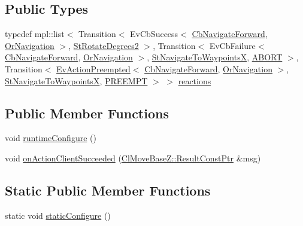 \subsection*{Public Types}
\begin{DoxyCompactItemize}
\item 
typedef mpl\+::list$<$ Transition$<$ Ev\+Cb\+Success$<$ \hyperlink{classcl__move__base__z_1_1CbNavigateForward}{Cb\+Navigate\+Forward}, \hyperlink{classsm__ridgeback__floor__coverage__static__1_1_1OrNavigation}{Or\+Navigation} $>$, \hyperlink{structsm__ridgeback__floor__coverage__static__1_1_1StRotateDegrees2}{St\+Rotate\+Degrees2} $>$, Transition$<$ Ev\+Cb\+Failure$<$ \hyperlink{classcl__move__base__z_1_1CbNavigateForward}{Cb\+Navigate\+Forward}, \hyperlink{classsm__ridgeback__floor__coverage__static__1_1_1OrNavigation}{Or\+Navigation} $>$, \hyperlink{structsm__ridgeback__floor__coverage__static__1_1_1StNavigateToWaypointsX}{St\+Navigate\+To\+WaypointsX}, \hyperlink{structsmacc_1_1default__transition__tags_1_1ABORT}{A\+B\+O\+RT} $>$, Transition$<$ \hyperlink{structsmacc_1_1default__events_1_1EvActionPreempted}{Ev\+Action\+Preempted}$<$ \hyperlink{classcl__move__base__z_1_1CbNavigateForward}{Cb\+Navigate\+Forward}, \hyperlink{classsm__ridgeback__floor__coverage__static__1_1_1OrNavigation}{Or\+Navigation} $>$, \hyperlink{structsm__ridgeback__floor__coverage__static__1_1_1StNavigateToWaypointsX}{St\+Navigate\+To\+WaypointsX}, \hyperlink{structsmacc_1_1default__transition__tags_1_1PREEMPT}{P\+R\+E\+E\+M\+PT} $>$ $>$ \hyperlink{structsm__ridgeback__floor__coverage__static__1_1_1StNavigateForward1_a6fc75d9b301c3f342815132aa4baba4e}{reactions}
\end{DoxyCompactItemize}
\subsection*{Public Member Functions}
\begin{DoxyCompactItemize}
\item 
void \hyperlink{structsm__ridgeback__floor__coverage__static__1_1_1StNavigateForward1_a5c06e290228ff7469666822fa041d767}{runtime\+Configure} ()
\item 
void \hyperlink{structsm__ridgeback__floor__coverage__static__1_1_1StNavigateForward1_ac459cf53276a9d78e6c40627c47a5e67}{on\+Action\+Client\+Succeeded} (\hyperlink{classcl__move__base__z_1_1ClMoveBaseZ_a99373d0c15ae96684462d8677f5fd632}{Cl\+Move\+Base\+Z\+::\+Result\+Const\+Ptr} \&msg)
\end{DoxyCompactItemize}
\subsection*{Static Public Member Functions}
\begin{DoxyCompactItemize}
\item 
static void \hyperlink{structsm__ridgeback__floor__coverage__static__1_1_1StNavigateForward1_afd6911c319690c06ce390268bd4ae566}{static\+Configure} ()
\end{DoxyCompactItemize}
